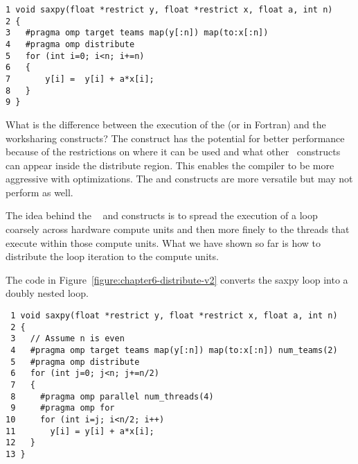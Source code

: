 \begin{figure*}[!tb]
\begin{verbatim}
1 void saxpy(float *restrict y, float *restrict x, float a, int n)
2 {
3   #pragma omp target teams map(y[:n]) map(to:x[:n]) 
4   #pragma omp distribute
5   for (int i=0; i<n; i+=n)
6   {
7       y[i] =  y[i] + a*x[i];
8   }
9 }
\end{verbatim}
\caption{ \textbf {Example of the distribute worksharing construct} -- \small
          Each initial thread created by the target teams construct 
          executes a subset of the iterations in the loop's iteration space.
         }
\label{figure:chapter6-distribute-v1}
\end{figure*}

What is the difference between the execution of the  (or  in Fortran) and the
 worksharing constructs? The  construct has the potential
for better performance because of the restrictions on where it can be used and
what other \OMP\ constructs can appear inside the distribute region.  This
enables the compiler to be more aggressive with optimizations.  The
 and  constructs are more versatile but may not perform as well.  

The idea behind the ~ and  constructs is to
spread the execution of a loop coarsely across hardware compute units and
then more finely to the threads that execute within those compute units.  What
we have shown so far is how to distribute the loop iteration to the compute
units.

The code in Figure~\ref{figure:chapter6-distribute-v2} converts the saxpy loop
into a doubly nested loop.  

\begin{figure*}[!tbh]
\begin{verbatim}
 1 void saxpy(float *restrict y, float *restrict x, float a, int n)
 2 {
 3   // Assume n is even
 4   #pragma omp target teams map(y[:n]) map(to:x[:n]) num_teams(2) 
 5   #pragma omp distribute
 6   for (int j=0; j<n; j+=n/2)
 7   {
 8     #pragma omp parallel num_threads(4)
 9     #pragma omp for
10     for (int i=j; i<n/2; i++)
11       y[i] = y[i] + a*x[i];
12   }
13 }
\end{verbatim}
\caption{ \textbf {Example of worksharing a loop across two levels of
                   parallelism} -- \small
          Use team level parallelism on the outer loop and thread level
          parallelism on the inner loop.  Distribute the loop iterations to two
          teams.  Each team then uses four threads to execute the iterations
          that are assigned to it.  
         }
\label{figure:chapter6-distribute-v2}
\end{figure*}

